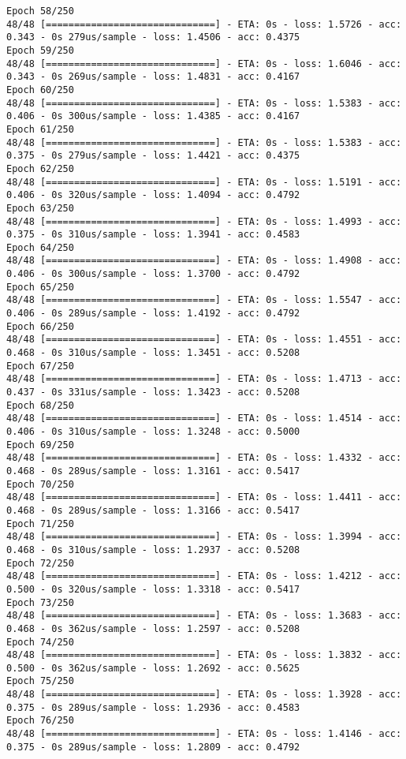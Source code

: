 \documentclass[11pt]{article}
\begin{document}
\begin{Verbatim}[commandchars=\\\{\}]
Epoch 58/250
48/48 [==============================] - ETA: 0s - loss: 1.5726 - acc: 0.343 - 0s 279us/sample - loss: 1.4506 - acc: 0.4375
Epoch 59/250
48/48 [==============================] - ETA: 0s - loss: 1.6046 - acc: 0.343 - 0s 269us/sample - loss: 1.4831 - acc: 0.4167
Epoch 60/250
48/48 [==============================] - ETA: 0s - loss: 1.5383 - acc: 0.406 - 0s 300us/sample - loss: 1.4385 - acc: 0.4167
Epoch 61/250
48/48 [==============================] - ETA: 0s - loss: 1.5383 - acc: 0.375 - 0s 279us/sample - loss: 1.4421 - acc: 0.4375
Epoch 62/250
48/48 [==============================] - ETA: 0s - loss: 1.5191 - acc: 0.406 - 0s 320us/sample - loss: 1.4094 - acc: 0.4792
Epoch 63/250
48/48 [==============================] - ETA: 0s - loss: 1.4993 - acc: 0.375 - 0s 310us/sample - loss: 1.3941 - acc: 0.4583
Epoch 64/250
48/48 [==============================] - ETA: 0s - loss: 1.4908 - acc: 0.406 - 0s 300us/sample - loss: 1.3700 - acc: 0.4792
Epoch 65/250
48/48 [==============================] - ETA: 0s - loss: 1.5547 - acc: 0.406 - 0s 289us/sample - loss: 1.4192 - acc: 0.4792
Epoch 66/250
48/48 [==============================] - ETA: 0s - loss: 1.4551 - acc: 0.468 - 0s 310us/sample - loss: 1.3451 - acc: 0.5208
Epoch 67/250
48/48 [==============================] - ETA: 0s - loss: 1.4713 - acc: 0.437 - 0s 331us/sample - loss: 1.3423 - acc: 0.5208
Epoch 68/250
48/48 [==============================] - ETA: 0s - loss: 1.4514 - acc: 0.406 - 0s 310us/sample - loss: 1.3248 - acc: 0.5000
Epoch 69/250
48/48 [==============================] - ETA: 0s - loss: 1.4332 - acc: 0.468 - 0s 289us/sample - loss: 1.3161 - acc: 0.5417
Epoch 70/250
48/48 [==============================] - ETA: 0s - loss: 1.4411 - acc: 0.468 - 0s 289us/sample - loss: 1.3166 - acc: 0.5417
Epoch 71/250
48/48 [==============================] - ETA: 0s - loss: 1.3994 - acc: 0.468 - 0s 310us/sample - loss: 1.2937 - acc: 0.5208
Epoch 72/250
48/48 [==============================] - ETA: 0s - loss: 1.4212 - acc: 0.500 - 0s 320us/sample - loss: 1.3318 - acc: 0.5417
Epoch 73/250
48/48 [==============================] - ETA: 0s - loss: 1.3683 - acc: 0.468 - 0s 362us/sample - loss: 1.2597 - acc: 0.5208
Epoch 74/250
48/48 [==============================] - ETA: 0s - loss: 1.3832 - acc: 0.500 - 0s 362us/sample - loss: 1.2692 - acc: 0.5625
Epoch 75/250
48/48 [==============================] - ETA: 0s - loss: 1.3928 - acc: 0.375 - 0s 289us/sample - loss: 1.2936 - acc: 0.4583
Epoch 76/250
48/48 [==============================] - ETA: 0s - loss: 1.4146 - acc: 0.375 - 0s 289us/sample - loss: 1.2809 - acc: 0.4792

\end{Verbatim}
\end{document}
